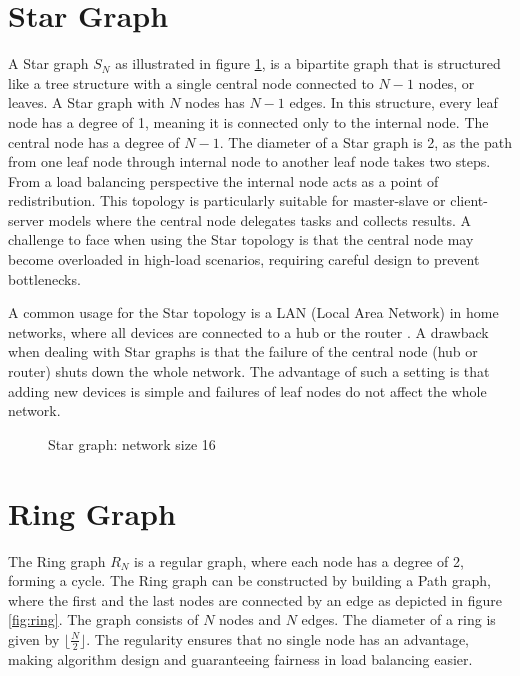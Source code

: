 \section{Star Graph}\label{sec:2stargraph}
A Star graph $S_N$ as illustrated in figure \ref{fig:stargraphDemo}, is a bipartite graph \cite{west2001introduction} that is structured like a tree structure with a single central node connected to $N-1$ nodes, or leaves. A Star graph with $N$ nodes has $N-1$ edges. In this structure, every leaf node has a degree of 1, meaning it is connected only to the internal node. The central node has a degree of $N-1$. The diameter of a Star graph is 2, as the path from one leaf node through internal node to another leaf node takes two steps. From a load balancing perspective the internal node acts as a point of redistribution. This topology is particularly suitable for master-slave or client-server models where the central node delegates tasks and collects results. A challenge to face when using the Star topology is that the central node may become overloaded in high-load scenarios, requiring careful design to prevent bottlenecks.

A common usage for the Star topology is a LAN (Local Area Network) in home networks, where all devices are connected to a hub or the router \cite{Jayeola2023}. A drawback when dealing with Star graphs is that the failure of the central node (hub or router) shuts down the whole network. The advantage of such a setting is that adding new devices is simple and failures of leaf nodes do not affect the whole network.

\begin{figure}[H]
    \centering
    
    \caption{Star graph: network size 16}
    \label{fig:stargraphDemo}
\end{figure}

\section{Ring Graph}\label{sec:2ringgraph}
The Ring graph $R_N$ is a regular graph, where each node has a degree of 2, forming a cycle. The Ring graph can be constructed by building a Path graph, where the first and the last nodes are connected by an edge as depicted in figure \ref{fig:ring}. The graph consists of $N$ nodes and $N$ edges. The diameter of a ring is given by $\lfloor{\frac{N}{2}}\rfloor$. The regularity ensures that no single node has an advantage, making algorithm design and guaranteeing fairness in load balancing easier.

